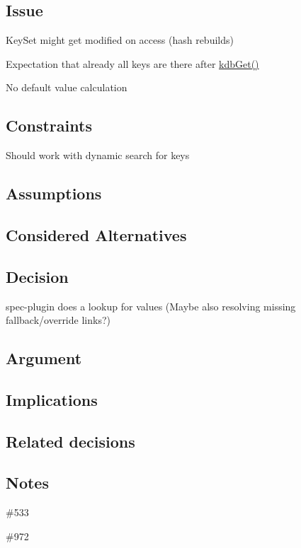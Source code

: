 \subsection*{Issue}


\begin{DoxyItemize}
\item Key\+Set might get modified on access (hash rebuilds)
\item Expectation that already all keys are there after {\ttfamily \hyperlink{group__kdb_ga28e385fd9cb7ccfe0b2f1ed2f62453a1}{kdb\+Get()}}
\item No default value calculation
\end{DoxyItemize}

\subsection*{Constraints}


\begin{DoxyItemize}
\item Should work with dynamic search for keys
\end{DoxyItemize}

\subsection*{Assumptions}

\subsection*{Considered Alternatives}

\subsection*{Decision}


\begin{DoxyItemize}
\item spec-\/plugin does a lookup for values (Maybe also resolving missing fallback/override links?)
\end{DoxyItemize}

\subsection*{Argument}

\subsection*{Implications}

\subsection*{Related decisions}

\subsection*{Notes}


\begin{DoxyItemize}
\item \#533
\item \#972 
\end{DoxyItemize}